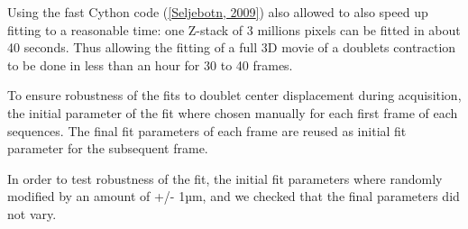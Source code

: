 \documentclass[A4paperpaper,11pt,english]{sphinxmanual}
\begin{document}
Using the fast Cython code ({\hyperref[index-latex:seljebotn2009]{{[}Seljebotn,  2009{]}}}) also allowed to also speed
up fitting to a reasonable time: one Z-stack of 3 millions pixels can be fitted
in about 40 seconds. Thus allowing the fitting of a full 3D movie of a doublets
contraction to be done in less than an hour for 30 to 40 frames.

To ensure robustness of the fits to doublet center displacement during
acquisition, the initial parameter of the fit where chosen manually for each
first frame of each sequences. The final fit parameters of each frame are reused
as initial fit parameter for the subsequent frame.

In order to test robustness of the fit, the initial fit parameters where randomly
modified by an amount of +/- 1µm, and we checked that the final parameters did
not vary.
\end{document}
